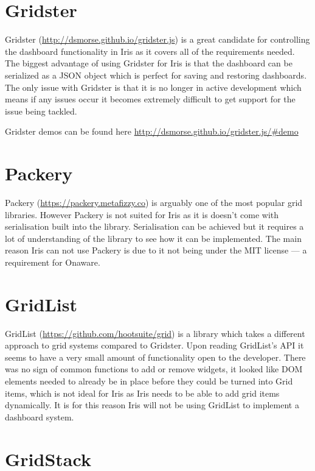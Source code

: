 \documentclass[12pt,a4paper,titlepage]{report}
\begin{document}
\begin{appendices}
\section{Gridster}

Gridster (\url{http://dsmorse.github.io/gridster.js}) is a great candidate for controlling the dashboard functionality in Iris as it covers all of the requirements needed. The biggest advantage of using Gridster for Iris is that the dashboard can be serialized as a JSON object which is perfect for saving and restoring dashboards. The only issue with Gridster is that it is no longer in active development which means if any issues occur it becomes extremely difficult to get support for the issue being tackled.

Gridster demos can be found here \url{http://dsmorse.github.io/gridster.js/#demo}

\section{Packery}

Packery (\url{https://packery.metafizzy.co}) is arguably one of the most popular grid libraries. However Packery is not suited for Iris as it is doesn’t come with serialisation built into the library. Serialisation can be achieved but it requires a lot of understanding of the library to see how it can be implemented. The main reason Iris can not use Packery is due to it not being under the MIT license — a requirement for Onaware.

\section{GridList}

GridList (\url{https://github.com/hootsuite/grid}) is a library which takes a different approach to grid systems compared to Gridster. Upon reading GridList’s API it seems to have a very small amount of functionality open to the developer. There was no sign of common functions to add or remove widgets, it looked like DOM elements needed to already be in place before they could be turned into Grid items, which is not ideal for Iris as Iris needs to be able to add grid items dynamically. It is for this reason Iris will not be using GridList to implement a dashboard system.

\section{GridStack}


\end{appendices}
\end{document}
